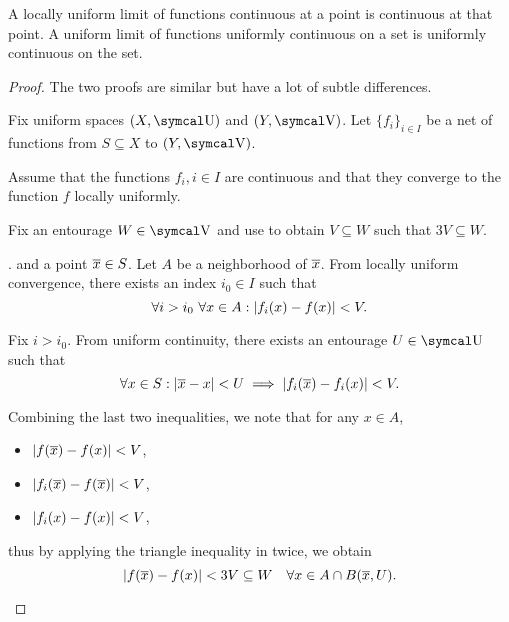 \begin{proposition}\label{def:uniform_limit_of_continuous_functions}
  \mbox{}
  \begin{propenum}
     A locally uniform limit of functions continuous at a point is continuous at that point.
     A uniform limit of functions uniformly continuous on a set is uniformly continuous on the set.
  \end{propenum}
\end{proposition}
\begin{proof}\mbox{}
  The two proofs are similar but have a lot of subtle differences.

  Fix uniform spaces \( (X, \CU) \) and \( (Y, \CV) \). Let \( \{ f_i \}_{i \in I} \) be a net of functions from \( S \subseteq X \) to \( (Y, \CV) \).

  \begin{description}
     Assume that the functions \( f_i, i \in I \) are continuous and that they converge to the function \( f \) locally uniformly.

    Fix an entourage \( W \in \CV \) and use  to obtain \( V \subseteq W \) such that \( 3V \subseteq W \).

    . and a point \( \overline{x} \in S \). Let \( A \) be a neighborhood of \( \overline{x} \). From locally uniform convergence, there exists an index \( i_0 \in I \) such that
    \begin{equation*}
      \forall i > i_0 \ \forall x \in A : \left\vert f_i(x) - f(x) \right\vert < V.
    \end{equation*}

    Fix \( i > i_0 \). From uniform continuity, there exists an entourage \( U \in \CU \) such that
    \begin{equation*}
      \forall x \in S : \left\vert \overline{x} - x \right\vert < U \implies \left\vert f_i(\overline{x}) - f_i(x) \right\vert < V.
    \end{equation*}

    Combining the last two inequalities, we note that for any \( x \in A \),
    \begin{itemize}
      \item \( \left\vert f(\overline{x}) - f(x) \right\vert < V \),
      \item \( \left\vert f_i(\overline{x}) - f(\overline{x}) \right\vert < V \),
      \item \( \left\vert f_i(x) - f(x) \right\vert < V \),
    \end{itemize}
    thus by applying the triangle inequality in  twice, we obtain
    \begin{equation*}
      \left\vert f(\overline{x}) - f(x) \right\vert < 3V \subseteq W \quad\forall x \in A \cap B(\overline{x}, U).
    \end{equation*}


\end{description}
\end{proof}
